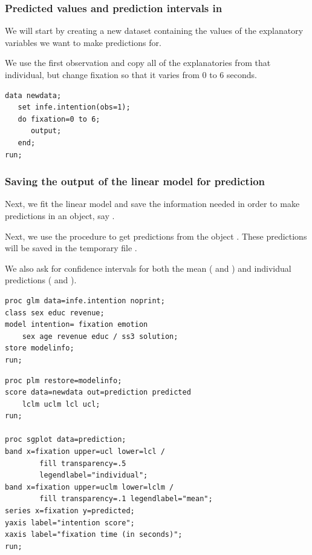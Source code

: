 \documentclass{beamer}
\begin{document}
\begin{frame}[fragile]
\frametitle{Predicted values and prediction intervals in \SASlang}
\bi
\item We will start by creating a new dataset  containing the values of the explanatory variables we want to make predictions for. 
\item We use the first observation and copy all of the explanatories from that individual, but change fixation so that it varies from $0$ to $6$ seconds.
\ei
\begin{tcolorbox}[colback=white, colframe=hecblue, title=\SASlang code to create a new dataset \code{newdata} ]
\begin{verbatim}
data newdata;
   set infe.intention(obs=1);
   do fixation=0 to 6;
      output;
   end;
run;
\end{verbatim}
\end{tcolorbox}
\end{frame}

\begin{frame}[fragile]
\frametitle{Saving the output of the linear model for prediction}
\bi
\item Next, we fit the linear model and save the information needed in order to make predictions in an object, say .
\item Next, we use the procedure  to get predictions from the object . These predictions will be saved in the temporary file .
\item We also ask for confidence intervals for both the mean ( and ) and individual predictions ( and ).
\ei
\begin{tcolorbox}[colback=white, colframe=hecblue, title=\SASlang code to save fit of linear models]
{\small
\begin{verbatim}
proc glm data=infe.intention noprint;
class sex educ revenue;
model intention= fixation emotion 
    sex age revenue educ / ss3 solution;
store modelinfo; 
run;
\end{verbatim}
}
\end{tcolorbox}
\end{frame}

\begin{frame}[fragile]

\begin{tcolorbox}[colback=white, colframe=hecblue, title=\SASlang code to get predictions using \code{plm} ]
\begin{verbatim}
proc plm restore=modelinfo; 
score data=newdata out=prediction predicted 
    lclm uclm lcl ucl; 
run;

proc sgplot data=prediction;
band x=fixation upper=ucl lower=lcl / 
        fill transparency=.5 
        legendlabel="individual";
band x=fixation upper=uclm lower=lclm / 
        fill transparency=.1 legendlabel="mean";
series x=fixation y=predicted;
yaxis label="intention score";
xaxis label="fixation time (in seconds)";
run;
\end{verbatim}
\end{tcolorbox}
\end{frame}
\end{document}

